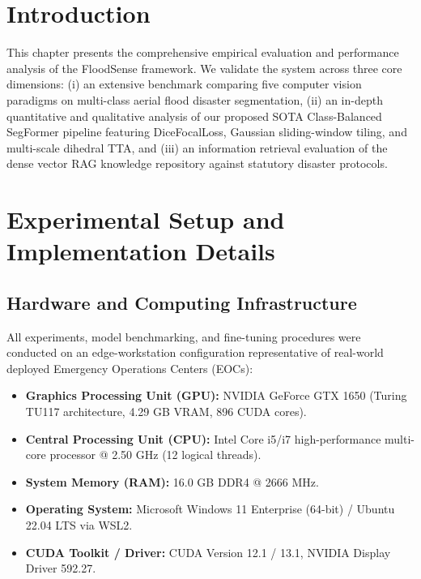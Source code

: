 \label{chap:experiments_results}

\section{Introduction}
This chapter presents the comprehensive empirical evaluation and performance analysis of the FloodSense framework. We validate the system across three core dimensions: (i) an extensive benchmark comparing five computer vision paradigms on multi-class aerial flood disaster segmentation, (ii) an in-depth quantitative and qualitative analysis of our proposed SOTA Class-Balanced SegFormer pipeline featuring DiceFocalLoss, Gaussian sliding-window tiling, and multi-scale dihedral TTA, and (iii) an information retrieval evaluation of the dense vector RAG knowledge repository against statutory disaster protocols.

\section{Experimental Setup and Implementation Details}

\subsection{Hardware and Computing Infrastructure}
All experiments, model benchmarking, and fine-tuning procedures were conducted on an edge-workstation configuration representative of real-world deployed Emergency Operations Centers (EOCs):
\begin{itemize}
    \item \textbf{Graphics Processing Unit (GPU):} NVIDIA GeForce GTX 1650 (Turing TU117 architecture, 4.29 GB VRAM, 896 CUDA cores).
    \item \textbf{Central Processing Unit (CPU):} Intel Core i5/i7 high-performance multi-core processor @ 2.50 GHz (12 logical threads).
    \item \textbf{System Memory (RAM):} 16.0 GB DDR4 @ 2666 MHz.
    \item \textbf{Operating System:} Microsoft Windows 11 Enterprise (64-bit) / Ubuntu 22.04 LTS via WSL2.
    \item \textbf{CUDA Toolkit / Driver:} CUDA Version 12.1 / 13.1, NVIDIA Display Driver 592.27.
\end{itemize}

